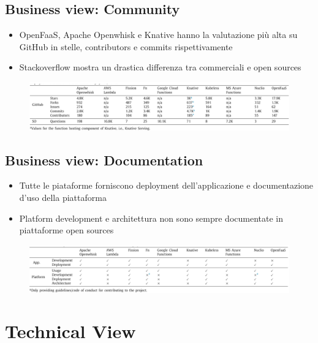 \documentclass[a4paper, 12pt]{report}
\begin{document}
            \subsection{Business view: Community}
            \begin{itemize}
              \item OpenFaaS, Apache Openwhisk e Knative hanno la valutazione più alta su GitHub in stelle, contributors e commits rispettivamente
              \item Stackoverflow mostra un drastica differenza tra commerciali e open sources
            \end{itemize}
            \begin{figure}[h]
              \centering
              \includegraphics[scale=0.3]{Immagini/Community.png}
            \end{figure}
            \subsection{Business view: Documentation}
            \begin{itemize}
              \item Tutte le piataforme forniscono deployment dell'applicazione e documentazione d'uso della piattaforma 
              \item Platform development e architettura non sono sempre documentate in piattaforme open sources
            \end{itemize}
            \begin{figure}[h]
              \centering
              \includegraphics[scale=0.3]{Immagini/Documentation.png}
            \end{figure}
            \clearpage
            \section{Technical View}
\end{document}
